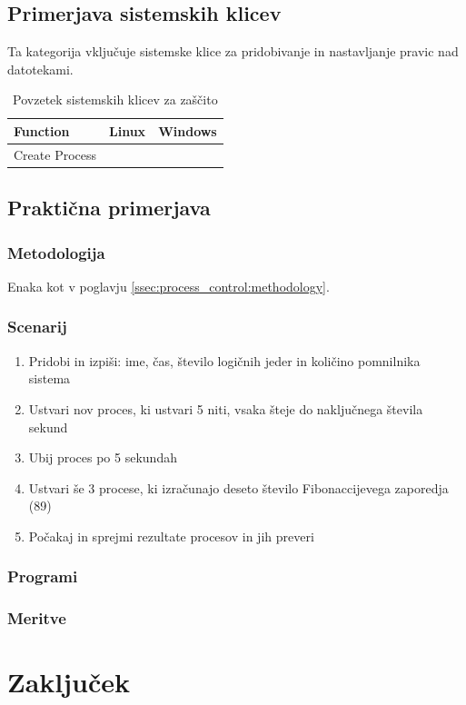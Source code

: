\documentclass[a4paper,12pt,openright]{book}
\begin{document}
\section{Primerjava sistemskih klicev}

Ta kategorija vključuje sistemske klice za pridobivanje in nastavljanje pravic nad datotekami.\cite{Silberschatz_Galvin_Gagne_2018}

\begin{table}[h!]
	\begin{center}
		\begin{tabular}{ p{3.7cm}|p{2.5cm}|p{6cm} }
			Function       & Linux   & Windows \\
			\hline
			Create Process & \verb|| & \verb|| \\
		\end{tabular}
	\end{center}
	\caption{Povzetek sistemskih klicev za zaščito}
	\label{tab:protection}
\end{table}

\section{Praktična primerjava}

\subsection{Metodologija}

Enaka kot v poglavju \ref{ssec:process_control:methodology}.

\subsection{Scenarij}

\begin{enumerate}
	\item Pridobi in izpiši: ime, čas, število logičnih jeder in količino pomnilnika sistema
	\item Ustvari nov proces, ki ustvari 5 niti, vsaka šteje do naključnega števila sekund
	\item Ubij proces po 5 sekundah
	\item Ustvari še 3 procese, ki izračunajo deseto število Fibonaccijevega zaporedja (89)
	\item Počakaj in sprejmi rezultate procesov in jih preveri
\end{enumerate}

\subsection{Programi}

\subsection{Meritve}

\chapter{Zaključek}


\printbibliography[heading=bibintoc,title={Literatura}]
\end{document}
